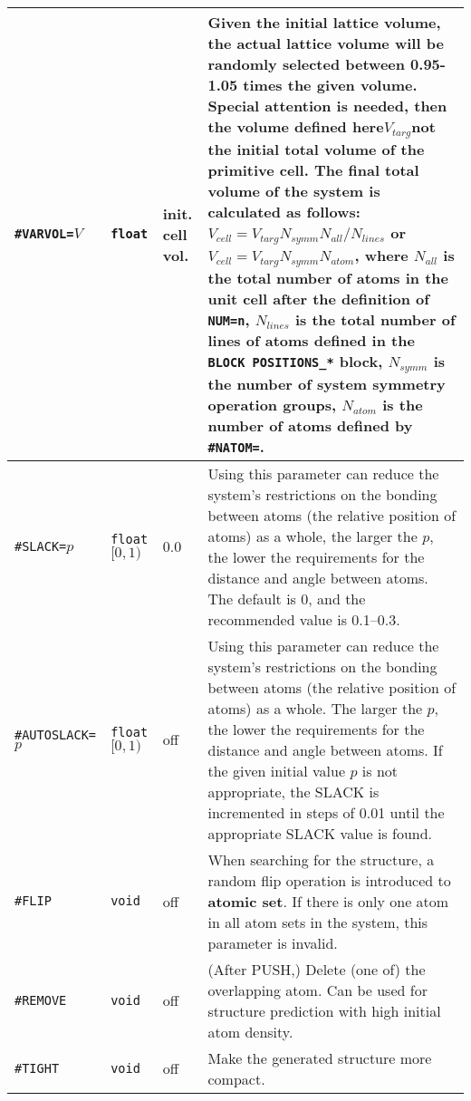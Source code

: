 \documentclass[a4paper, 10pt]{article}
\begin{document}
\begin{center}
\begin{longtable}{m{11em}|m{4em}<{\centering}|m{3em}<{\centering}|m{15em}}
\verb|#VARVOL=|\(V\)& \verb|float| & init. cell vol. & Given the initial lattice volume, the actual lattice volume will be randomly selected between 0.95-1.05 times the given volume. \textbf{Special attention is needed}, then the volume defined here\(V_{targ}\)\textbf{not} the initial total volume of the primitive cell. The final total volume of the system is calculated as follows: \(V_{cell} = V_{targ} N_{symm} N_{all} / N_{lines}\) or \( V_{cell} = V_{targ} N_{symm} N_{atom} \), where \(N_{all}\) is the total number of atoms in the unit cell after the definition of \verb|NUM=n|, \(N_{lines}\) is the total number of lines of atoms defined in the \verb|BLOCK POSITIONS_*| block, \(N_{symm}\) is the number of system symmetry operation groups, \(N_{atom}\) is the number of atoms defined by \verb|#NATOM=|.\\
\midrule
\verb|#SLACK=|\(p\)& \verb|float| \([0,1)\) & 0.0 & Using this parameter can reduce the system's restrictions on the bonding between atoms (the relative position of atoms) as a whole, the larger the \(p\), the lower the requirements for the distance and angle between atoms. The default is 0, and the recommended value is 0.1--0.3.\\
\midrule
\verb|#AUTOSLACK=|\(p\)& \verb|float| \([0,1)\) & off & Using this parameter can reduce the system's restrictions on the bonding between atoms (the relative position of atoms) as a whole. The larger the \(p\), the lower the requirements for the distance and angle between atoms. If the given initial value \(p\) is not appropriate, the SLACK is incremented in steps of 0.01 until the appropriate SLACK value is found.\\
\midrule
\verb|#FLIP|& \verb|void| & off & When searching for the structure, a random flip operation is introduced to \textbf{atomic set}. If there is only one atom in all atom sets in the system, this parameter is invalid.\\
\midrule
\verb|#REMOVE|& \verb|void| & off & (After PUSH,) Delete (one of) the overlapping atom. Can be used for structure prediction with high initial atom density.\\
\midrule
\verb|#TIGHT|& \verb|void| & off & Make the generated structure more compact.\\
\midrule

\end{longtable}
\end{center}
\end{document}
